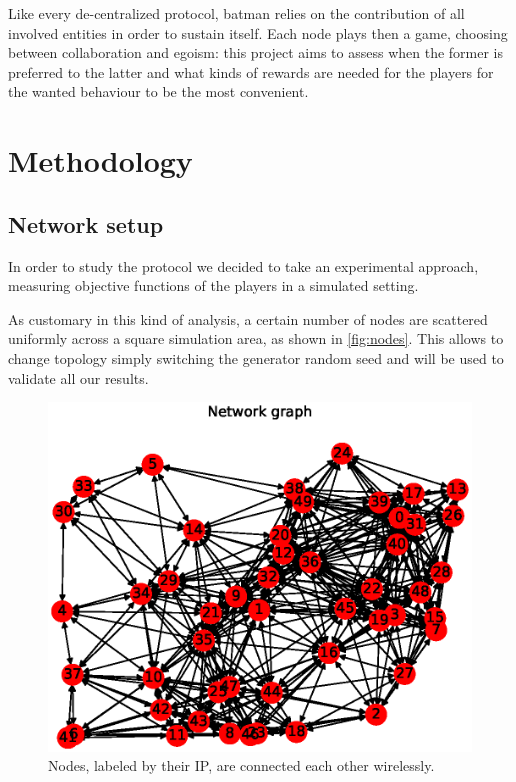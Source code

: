 \documentclass[conference]{IEEEtran}
\begin{document}
Like every de-centralized protocol, \gls{batman} relies on the contribution of all involved entities in order to sustain itself. Each node plays then a game, choosing between collaboration and egoism: this project aims to assess when the former is preferred to the latter and what kinds of rewards are needed for the players for the wanted behaviour to be the most convenient.

\section{Methodology}

\subsection{Network setup}

In order to study the protocol we decided to take an experimental approach, measuring objective functions of the players in a simulated setting.

As customary in this kind of analysis, a certain number of nodes are scattered uniformly across a square simulation area, as shown in \autoref{fig:nodes}. This allows to change topology simply switching the generator random seed and will be used to validate all our results.

\begin{figure}[h]
  \centering
  \includegraphics[width=\linewidth]{figures/example_graph}
  \caption{Nodes, labeled by their IP, are connected each other wirelessly.}
  \label{fig:nodes}
\end{figure}
\end{document}
